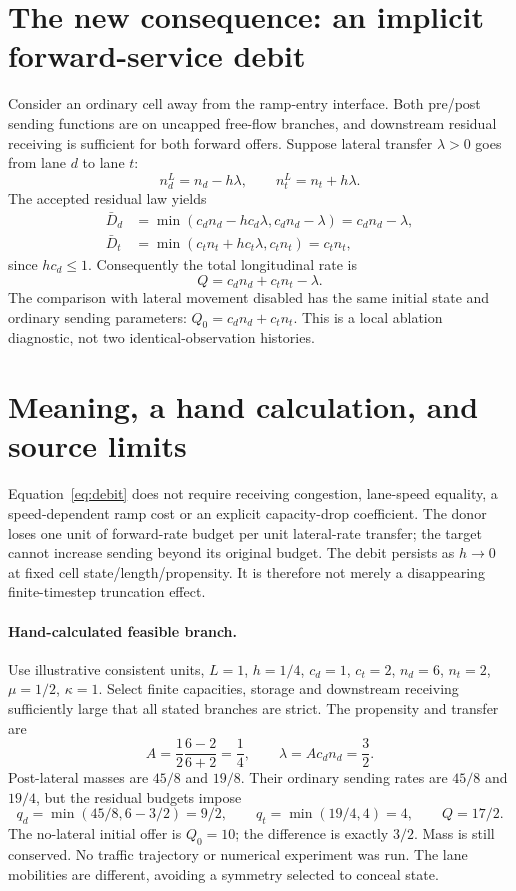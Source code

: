 \documentclass[10pt,a4paper]{article}
\begin{document}
\section{The new consequence: an implicit forward-service debit}
Consider an ordinary cell away from the ramp-entry interface. Both pre/post
sending functions are on uncapped free-flow branches, and downstream residual
receiving is sufficient for both forward offers. Suppose lateral transfer
$\lambda>0$ goes from lane $d$ to lane $t$:
\begin{equation}
 n_d^L=n_d-h\lambda,\qquad n_t^L=n_t+h\lambda.
\end{equation}
The accepted residual law yields
\begin{align}
 \bar D_d&=\min(c_d n_d-hc_d\lambda,c_d n_d-\lambda)
           =c_d n_d-\lambda,\\
 \bar D_t&=\min(c_t n_t+hc_t\lambda,c_t n_t)=c_t n_t,
 \label{eq:free}
\end{align}
since $hc_d\leq1$. Consequently the total longitudinal rate is
\begin{equation}
 Q=c_d n_d+c_t n_t-\lambda.\label{eq:debit}
\end{equation}
The comparison with lateral movement disabled has the same initial state
and ordinary sending parameters: $Q_0=c_d n_d+c_t n_t$.
This is a local ablation diagnostic, not two identical-observation histories.
\newpage

\section{Meaning, a hand calculation, and source limits}
Equation~\eqref{eq:debit} does not require receiving congestion, lane-speed
equality, a speed-dependent ramp cost or an explicit capacity-drop coefficient.
The donor loses one unit of forward-rate budget per unit lateral-rate transfer;
the target cannot increase sending beyond its original budget.
The debit persists as $h\to0$ at fixed cell state/length/propensity. It is
therefore not merely a disappearing finite-timestep truncation effect.

\paragraph{Hand-calculated feasible branch.}
Use illustrative consistent units, $L=1$, $h=1/4$, $c_d=1$, $c_t=2$,
$n_d=6$, $n_t=2$, $\mu=1/2$, $\kappa=1$. Select finite capacities, storage
and downstream receiving sufficiently large that all stated branches are strict.
The propensity and transfer are
\begin{equation}
 A=\frac12\frac{6-2}{6+2}=\frac14,\qquad \lambda=A c_d n_d=\frac32.
\end{equation}
Post-lateral masses are $45/8$ and $19/8$. Their ordinary sending rates are
$45/8$ and $19/4$, but the residual budgets impose
\begin{equation}
 q_d=\min(45/8,6-3/2)=9/2,\qquad
 q_t=\min(19/4,4)=4,\qquad Q=17/2.
\end{equation}
The no-lateral initial offer is $Q_0=10$; the difference is exactly $3/2$.
Mass is still conserved. No traffic trajectory or numerical experiment was run.
The lane mobilities are different, avoiding a symmetry selected to conceal state.
\end{document}
